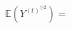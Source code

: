 \documentclass[preview]{standalone}
\begin{document}
\begin{align*}
\mathbb{E}(Y^{(t)}^{\odot2}) =
\end{align*}
\end{document}
